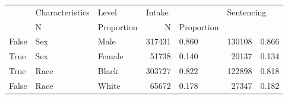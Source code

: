 \begin{tabular}{lllrlrl}
\toprule
{} & Characteristics &   Level & \multicolumn{2}{l}{Intake} & \multicolumn{2}{l}{Sentencing} \\
{} &       N & Proportion &          N & Proportion \\
\midrule
False &             Sex &    Male &  317431 &      0.860 &     130108 &      0.866 \\
True  &             Sex &  Female &   51738 &      0.140 &      20137 &      0.134 \\
True  &            Race &   Black &  303727 &      0.822 &     122898 &      0.818 \\
False &            Race &   White &   65672 &      0.178 &      27347 &      0.182 \\
\bottomrule
\end{tabular}
